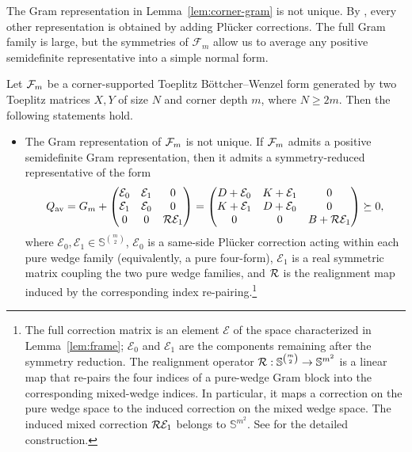 The Gram representation in Lemma~\ref{lem:corner-gram} is not unique.  By , every other representation is obtained by adding Pl\"ucker corrections.  The full Gram family is large, but the symmetries of $\mathcal F_m$
allow us to average any positive semidefinite representative into a
simple normal form.  

\begin{lemma}
\label{lem:normal-form}
Let $\mathcal{F}_m$ be a corner-supported Toeplitz B\"ottcher--Wenzel form
generated by two Toeplitz matrices $X,Y$ of size $N$ and corner depth
$m$, where $N\ge2m$.  Then the following statements hold.
\begin{itemize}

\item The Gram representation of $\mathcal{F}_m$ is not unique.  If $\mathcal{F}_m$
admits a positive semidefinite Gram representation, then it admits a
symmetry-reduced representative of the form
\begin{equation}\label{eq:general-gram-1}
 Q_{\rm av}=G_m+
 \begin{pmatrix}
 \mathcal E_0&\mathcal E_1&0\\
 \mathcal E_1&\mathcal E_0&0\\
 0&0&\mathcal{R}\mathcal E_1
 \end{pmatrix}
 =
 \begin{pmatrix}
 D+\mathcal E_0&K+\mathcal E_1&0\\
 K+\mathcal E_1&D+\mathcal E_0&0\\
 0&0&B+\mathcal{R}\mathcal E_1
 \end{pmatrix}\succeq0,
\end{equation}
where $\mathcal E_0,\mathcal E_1\in\mathbb S^{\binom m2}$,
$\mathcal E_0$ is a same-side Pl\"ucker correction acting within each
pure wedge family (equivalently, a pure four-form),
$\mathcal E_1$ is a real symmetric matrix coupling the two pure wedge
families, and $\mathcal{R}$ is the realignment map induced by the corresponding
index re-pairing.\footnote{The full correction matrix is an element
$\mathcal E$ of the space characterized in Lemma~\ref{lem:frame};
$\mathcal E_0$ and $\mathcal E_1$ are the components remaining after
the symmetry reduction. The realignment operator
$
\mathcal{R}:\mathbb S^{\binom m2}\to\mathbb S^{m^2}
$
is a linear map that re-pairs the four indices of a pure-wedge Gram block into the corresponding mixed-wedge indices.  In particular, it maps a correction on the pure wedge space to the induced correction on the mixed wedge space. The induced mixed correction
$\mathcal{R}\mathcal E_1$ belongs to $\mathbb S^{m^2}$.  See
 for the detailed construction.}


\end{itemize}
\end{lemma}
